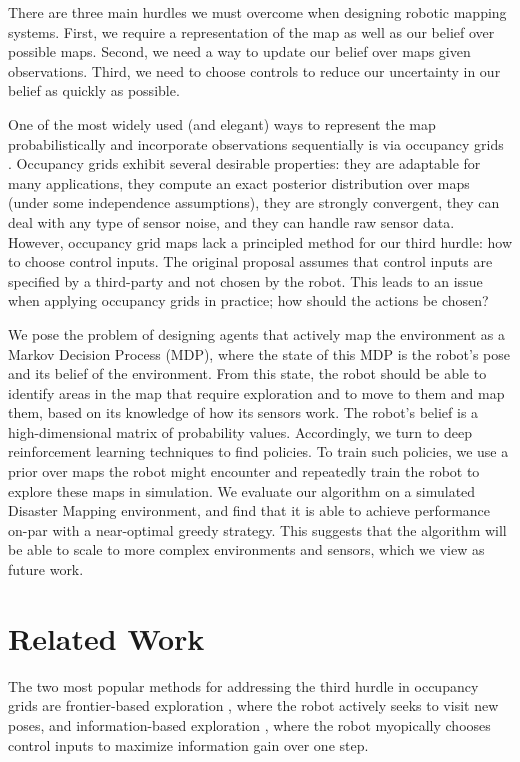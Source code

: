 \documentclass{article}
\begin{document}
There are three main hurdles we must overcome when designing robotic mapping systems. First, we require a representation of the map as well as our belief over possible maps. Second, we need a way to update our belief over maps given observations. Third, we need to choose controls to reduce our uncertainty in our belief as quickly as possible.

One of the most widely used (and elegant) ways to represent the map probabilistically and incorporate observations sequentially is via occupancy grids \cite{elfes1989using}. Occupancy grids exhibit several desirable properties: they are adaptable for many applications, they compute an exact posterior distribution over maps (under some independence assumptions), they are strongly convergent, they can deal with any type of sensor noise, and they can handle raw sensor data. However, occupancy grid maps lack a principled method for our third hurdle: how to choose control inputs. The original proposal assumes that control inputs are specified by a third-party and not chosen by the robot. This leads to an issue when applying occupancy grids in practice; how should the actions be chosen?

We pose the problem of designing agents that actively map the environment as a Markov Decision Process (MDP), where the state of this MDP is the robot's pose and its belief of the environment. From this state, the robot should be able to identify areas in the map that require exploration and to move to them and map them, based on its knowledge of how its sensors work. The robot's belief is a high-dimensional matrix of probability values. Accordingly, we turn to deep reinforcement learning techniques to find policies. To train such policies, we use a prior over maps the robot might encounter and repeatedly train the robot to explore these maps in simulation. We evaluate our algorithm on a simulated Disaster Mapping environment, and find that it is able to achieve performance on-par with a near-optimal greedy strategy. This suggests that the algorithm will be able to scale to more complex environments and sensors, which we view as future work.

\section{Related Work}

The two most popular methods for addressing the third hurdle in occupancy grids are frontier-based exploration \cite{yamauchi1997frontier}, where the robot actively seeks to visit new poses, and information-based exploration \cite{bourgault2002information}, where the robot myopically chooses control inputs to maximize information gain over one step.
\end{document}

